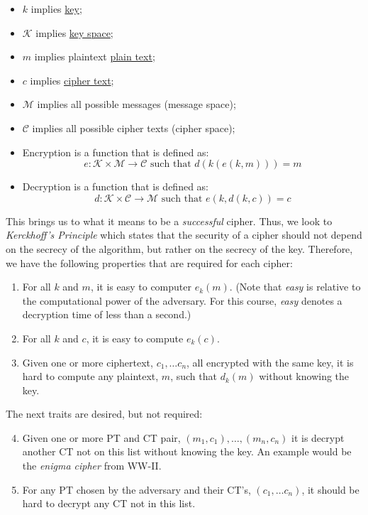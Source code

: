 \begin{itemize}
    \item \(k\) implies \hyperlink{Key}{key};
    \item \(\mathcal{K}\) implies \hyperlink{Key Space}{key space};
    \item \(m\) implies plaintext \hyperlink{Plain Text}{plain text};
    \item \(c\) implies \hyperlink{Cipher Text}{cipher text};
    \item \(\mathcal{M}\) implies all possible messages (message space);
    \item \(\mathcal{C}\) implies all possible cipher texts (cipher space);
    \item Encryption is a function that is defined as: \[e: \mathcal{K} \times \mathcal{M} \rightarrow \mathcal{C} \text{ such that } d(k(e(k,m))) = m\]
    \item Decryption is a function that is defined as: \[d: \mathcal{K} \times \mathcal{C} \rightarrow \mathcal{M} \text{ such that } e(k,d(k,c)) = c\]
\end{itemize}

This brings us to what it means to be a \textit{successful} cipher. Thus, we look to \textit{Kerckhoff's Principle} which states that the security of a cipher should not depend on the secrecy of the algorithm, but rather on the secrecy of the key. Therefore, we have the following properties that are required for each cipher:
\begin{enumerate}[label=\arabic*.]
    \item For all \(k\) and \(m\), it is easy to computer \(e_k(m)\). (Note that \textit{easy} is relative to the computational power of the adversary. For this course, \textit{easy} denotes a decryption time of less than a second.)
    \item For all \(k\) and \(c\), it is easy to compute \(e_k(c)\).
    \item Given one or more ciphertext, \(c_1,\dots c_n\), all encrypted with the same key, it is hard to compute any plaintext, \(m\), such that \(d_k(m)\) without knowing the key. 
\end{enumerate}

The next traits are desired, but not required:

\begin{enumerate}[label=\arabic*.]
    \setcounter{enumi}{3}
    \item Given one or more PT and CT pair, \((m_1,c_1),\dots,(m_n,c_n)\) it is decrypt another CT not on this list without knowing the key. An example would be the \textit{enigma cipher} from WW-II\@.
    \item For any PT chosen by the adversary and their CT's, \((c_1,\dots c_n)\), it should be hard to decrypt any CT not in this list.
\end{enumerate}


